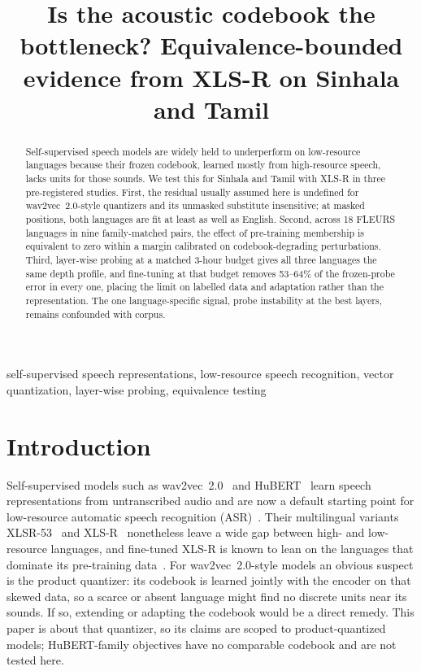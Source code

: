 \documentclass{article}
\title{Is the acoustic codebook the bottleneck? Equivalence-bounded evidence from XLS-R on Sinhala and Tamil}
\begin{document}
\maketitle

\begin{abstract}
Self-supervised speech models are widely held to underperform on low-resource languages because their frozen codebook, learned mostly from high-resource speech, lacks units for those sounds. We test this for Sinhala and Tamil with XLS-R in three pre-registered studies. First, the residual usually assumed here is undefined for wav2vec~2.0-style quantizers and its unmasked substitute insensitive; at masked positions, both languages are fit at least as well as English. Second, across 18 FLEURS languages in nine family-matched pairs, the effect of pre-training membership is equivalent to zero within a margin calibrated on codebook-degrading perturbations. Third, layer-wise probing at a matched 3-hour budget gives all three languages the same depth profile, and fine-tuning at that budget removes 53--64\% of the frozen-probe error in every one, placing the limit on labelled data and adaptation rather than the representation. The one language-specific signal, probe instability at the best layers, remains confounded with corpus.
\end{abstract}

\begin{keywords}
self-supervised speech representations, low-resource speech recognition, vector quantization, layer-wise probing, equivalence testing
\end{keywords}

\section{Introduction}
\label{sec:intro}

Self-supervised models such as wav2vec~2.0~\cite{baevski2020wav2vec} and HuBERT~\cite{hsu2021hubert} learn speech representations from untranscribed audio and are now a default starting point for low-resource automatic speech recognition (ASR)~\cite{mohamed2022review}. Their multilingual variants XLSR-53~\cite{conneau2021xlsr} and XLS-R~\cite{babu2022xlsr} nonetheless leave a wide gap between high- and low-resource languages, and fine-tuned XLS-R is known to lean on the languages that dominate its pre-training data~\cite{storey2024bias}. For wav2vec~2.0-style models an obvious suspect is the product quantizer: its codebook is learned jointly with the encoder on that skewed data, so a scarce or absent language might find no discrete units near its sounds. If so, extending or adapting the codebook would be a direct remedy. This paper is about that quantizer, so its claims are scoped to product-quantized models; HuBERT-family objectives have no comparable codebook and are not tested here.
\end{document}
